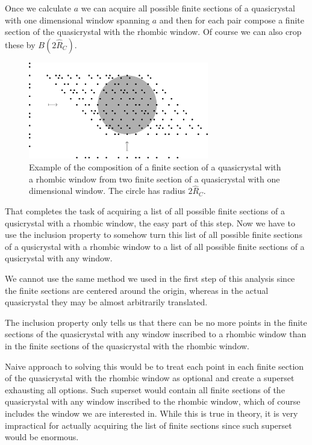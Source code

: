 \documentclass[text.tex]{subfiles}
\begin{document}
Once we calculate $a$ we can acquire all possible finite sections of a quasicrystal with one dimensional window spanning $a$ and then for each pair compose a finite section of the quasicrystal with the rhombic window. Of course we can also crop these by $B(2\hat{R}_C)$. 

\begin{figure}[h!]
\centering
\includegraphics[width=0.7\textwidth]{img/2D/compositionFinite}
\caption{Example of the composition of a finite section of a quasicrystal with a rhombic window from two finite section of a quasicrystal with one dimensional window. The circle has radius $2\hat{R}_C$. }
\label{fig_quasicrystalExampleComposition}
\end{figure}

That completes the task of acquiring a list of all possible finite sections of a qusicrystal with a rhombic window, the easy part of this step. Now we have to use the inclusion property to somehow turn this list of all possible finite sections of a qusicrystal with a rhombic window to a list of all possible finite sections of a qusicrystal with any window. 

We cannot use the same method we used in the first step of this analysis since the finite sections are centered around the origin, whereas in the actual quasicrystal they may be almost arbitrarily translated. 

The inclusion property only tells us that there can be no more points in the finite sections of the quasicrystal with any window inscribed to a rhombic window than in the finite sections of the quasicrystal with the rhombic window. 

Naive approach to solving this would be to treat each point in each finite section of the quasicrystal with the rhombic window as optional and create a superset exhausting all options. Such superset would contain all finite sections of the quasicrystal with any window inscribed to the rhombic window, which of course includes the window we are interested in. While this is true in theory, it is very impractical for actually acquiring the list of finite sections since such superset would be enormous. 
\end{document}
